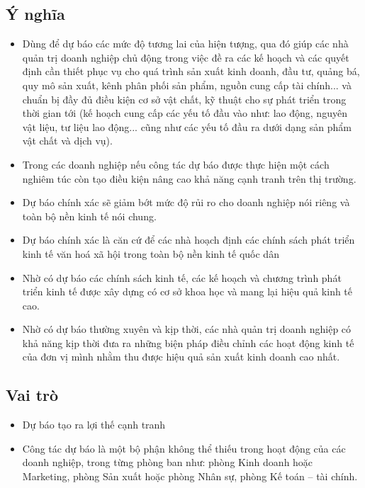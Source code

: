 \subsection{Ý nghĩa}
\begin{itemize}
    \item Dùng để dự báo các mức độ tương lai của hiện tượng, qua đó giúp các nhà quản trị doanh nghiệp chủ động trong việc đề ra các kế hoạch và các quyết định cần thiết phục vụ cho quá trình sản xuất kinh doanh, đầu tư, quảng bá, quy mô sản xuất, kênh phân phối sản phẩm, nguồn cung cấp tài chính... và chuẩn bị đầy đủ điều kiện cơ sở vật chất, kỹ thuật cho sự phát triển trong thời gian tới (kế hoạch cung cấp các yếu tố đầu vào như: lao động, nguyên vật liệu, tư liệu lao động... cũng như các yếu tố đầu ra dưới dạng sản phẩm vật chất và dịch vụ). \\
    \item Trong các doanh nghiệp nếu công tác dự báo được thực hiện một cách nghiêm túc còn tạo điều kiện nâng cao khả năng cạnh tranh trên thị trường.\\
    \item Dự báo chính xác sẽ giảm bớt mức độ rủi ro cho doanh nghiệp nói riêng và toàn bộ nền kinh tế nói chung. \\
    \item Dự báo chính xác là căn cứ để các nhà hoạch định các chính sách phát triển kinh tế văn hoá xã hội trong toàn bộ nền kinh tế quốc dân \\
    \item Nhờ có dự báo các chính sách kinh tế, các kế hoạch và chương trình phát triển kinh tế được xây dựng có cơ sở khoa học và mang lại hiệu quả kinh tế cao.\\
    \item Nhờ có dự báo thường xuyên và kịp thời, các nhà quản trị doanh nghiệp có khả năng kịp thời đưa ra những biện pháp điều chỉnh các hoạt động kinh tế của đơn vị mình nhằm thu được hiệu quả sản xuất kinh doanh cao nhất. \\
\end{itemize}
\subsection{Vai trò}
\begin{itemize}
    \item Dự báo tạo ra lợi thế cạnh tranh \\
    \item Công tác dự báo là một bộ phận không thể thiếu trong hoạt động của các doanh nghiệp, trong từng phòng ban như: phòng Kinh doanh hoặc Marketing, phòng Sản xuất hoặc phòng Nhân sự, phòng Kế toán – tài chính. \\
\end{itemize}
